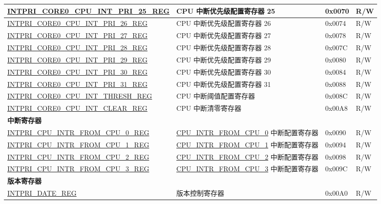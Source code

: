 \begin{longtable}{ | p{10cm} | p{10cm} | p{1.3cm} | p{1cm} | }
\hyperref[regdesc:INTPRICORE0CPUINTPRINREG]{INTPRI\_CORE0\_CPU\_INT\_PRI\_25\_REG} & CPU 中断优先级配置寄存器 25 & 0x0070 & R/W \\ \hline
\hyperref[regdesc:INTPRICORE0CPUINTPRINREG]{INTPRI\_CORE0\_CPU\_INT\_PRI\_26\_REG} & CPU 中断优先级配置寄存器 26 & 0x0074 & R/W \\ \hline
\hyperref[regdesc:INTPRICORE0CPUINTPRINREG]{INTPRI\_CORE0\_CPU\_INT\_PRI\_27\_REG} & CPU 中断优先级配置寄存器 27 & 0x0078 & R/W \\ \hline
\hyperref[regdesc:INTPRICORE0CPUINTPRINREG]{INTPRI\_CORE0\_CPU\_INT\_PRI\_28\_REG} & CPU 中断优先级配置寄存器 28 & 0x007C & R/W \\ \hline
\hyperref[regdesc:INTPRICORE0CPUINTPRINREG]{INTPRI\_CORE0\_CPU\_INT\_PRI\_29\_REG} & CPU 中断优先级配置寄存器 29 & 0x0080 & R/W \\ \hline
\hyperref[regdesc:INTPRICORE0CPUINTPRINREG]{INTPRI\_CORE0\_CPU\_INT\_PRI\_30\_REG} & CPU 中断优先级配置寄存器 30 & 0x0084 & R/W \\ \hline
\hyperref[regdesc:INTPRICORE0CPUINTPRINREG]{INTPRI\_CORE0\_CPU\_INT\_PRI\_31\_REG} & CPU 中断优先级配置寄存器 31 & 0x0088 & R/W \\ \hline
\hyperref[regdesc:INTPRICORE0CPUINTTHRESHREG]{INTPRI\_CORE0\_CPU\_INT\_THRESH\_REG} & CPU 中断阈值配置寄存器  & 0x008C & R/W \\ \hline
\hyperref[regdesc:INTPRICORE0CPUINTCLEARREG]{INTPRI\_CORE0\_CPU\_INT\_CLEAR\_REG} & CPU 中断清零寄存器 & 0x00A8 & R/W \\ \hline
\multicolumn{4}{|l|}{\textbf{中断寄存器}} \\ \hline
\hyperref[regdesc:INTPRICPUINTRFROMCPUNREG]{INTPRI\_CPU\_INTR\_FROM\_CPU\_0\_REG} & \hyperref[CPUINTRFROMCPU0]{CPU\_INTR\_FROM\_CPU\_0} 中断配置寄存器 & 0x0090 & R/W \\ \hline
\hyperref[regdesc:INTPRICPUINTRFROMCPUNREG]{INTPRI\_CPU\_INTR\_FROM\_CPU\_1\_REG} & \hyperref[CPUINTRFROMCPU0]{CPU\_INTR\_FROM\_CPU\_1} 中断配置寄存器 & 0x0094 & R/W \\ \hline
\hyperref[regdesc:INTPRICPUINTRFROMCPUNREG]{INTPRI\_CPU\_INTR\_FROM\_CPU\_2\_REG} & \hyperref[CPUINTRFROMCPU0]{CPU\_INTR\_FROM\_CPU\_2} 中断配置寄存器 & 0x0098 & R/W \\ \hline
\hyperref[regdesc:INTPRICPUINTRFROMCPUNREG]{INTPRI\_CPU\_INTR\_FROM\_CPU\_3\_REG} & \hyperref[CPUINTRFROMCPU0]{CPU\_INTR\_FROM\_CPU\_3} 中断配置寄存器 & 0x009C & R/W \\ \hline
\multicolumn{4}{|l|}{\textbf{版本寄存器}} \\ \hline
\hyperref[regdesc:INTPRIDATEREG]{INTPRI\_DATE\_REG} & 版本控制寄存器 & 0x00A0 & R/W \\ \hline
\end{longtable}
